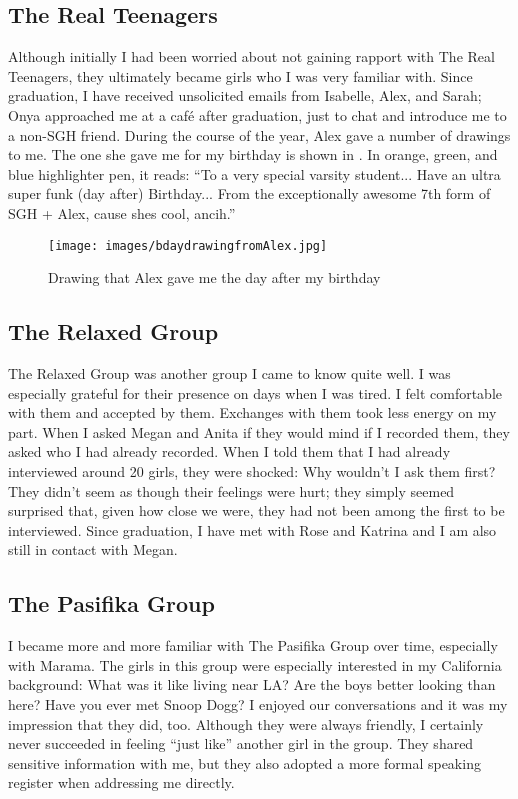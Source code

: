\subsection{The Real Teenagers}
Although initially I had been worried about not gaining rapport with The Real Teenagers, they ultimately became girls who I was very familiar with. Since graduation, I have received unsolicited emails from Isabelle, Alex, and Sarah; Onya approached me at a caf\'e after graduation, just to chat and introduce me to a non-SGH friend. During the course of the year, Alex gave a number of drawings to me. The one she gave me for my birthday is shown in . In orange, green, and blue highlighter pen, it reads: ``To a very special varsity student... Have an ultra super funk (day after) Birthday... From the exceptionally awesome 7th form of SGH + Alex, cause shes cool, ancih.''


\begin{figure}
	\centering
		\texttt{[image: images/bdaydrawingfromAlex.jpg]}
	\caption{Drawing that Alex gave me the day after my birthday}
	\label{fig:bdaydrawing}
\end{figure}


\subsection{The Relaxed Group}
The Relaxed Group was another group I came to know quite well. I was especially grateful for their presence on days when I was tired. I felt comfortable with them and accepted by them. Exchanges with them took less energy on my part. When I asked Megan and Anita if they would mind if I recorded them, they asked who I had already recorded. When I told them that I had already interviewed around 20 girls, they were shocked: Why wouldn't I ask them first?  They didn't seem as though their feelings were hurt; they simply seemed surprised that, given how close we were, they had not been among the first to be interviewed. Since graduation, I have met with Rose and Katrina and I am also still in contact with Megan.

\subsection{The Pasifika Group}
I became more and more familiar with The Pasifika Group over time, especially with Marama. The girls in this group were especially interested in my California background: What was it like living near LA?  Are the boys better looking than here?  Have you ever met Snoop Dogg?  I enjoyed our conversations and it was my impression that they did, too. Although they were always friendly, I certainly never succeeded in feeling ``just like'' another girl in the group. They shared sensitive information with me, but they also adopted a more formal speaking register when addressing me directly. 

